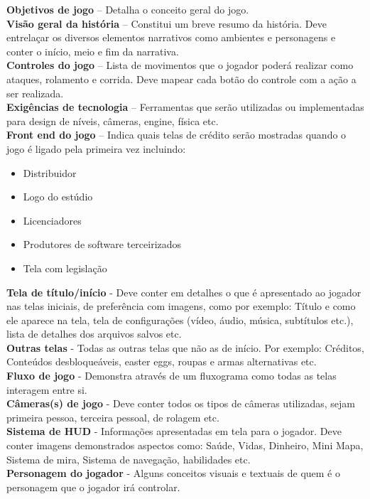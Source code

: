 \documentclass[12pt, 
openright, 
oneside, 
a4paper,    
brazil]{facom-ufu-abntex2}
\begin{document}
\textbf{Objetivos de jogo} – Detalha o conceito geral do jogo.\\
\textbf{Visão geral da história} – Constitui um breve resumo da história. Deve entrelaçar os diversos elementos narrativos como ambientes e personagens e conter o início, meio e fim da narrativa. \\
\textbf{Controles do jogo} – Lista de movimentos que o jogador poderá realizar como ataques, rolamento e corrida. Deve mapear cada botão do controle com a ação a ser realizada. \\
\textbf{Exigências de tecnologia} – Ferramentas que serão utilizadas ou implementadas para design de níveis, câmeras, engine, física etc. \\
\textbf{Front end do jogo} – Indica quais telas de crédito serão mostradas quando o jogo é ligado pela primeira vez incluindo: 
	\begin{itemize}
	\item Distribuidor
	\item Logo do estúdio
	\item Licenciadores
	\item Produtores de software terceirizados
	\item Tela com legislação
	\end{itemize}
\textbf{Tela de título/início} - Deve conter em detalhes o que é apresentado ao jogador nas telas iniciais, de preferência com imagens, como por exemplo: Título e como ele aparece na tela, tela de configurações (vídeo, áudio, música, subtítulos etc.), lista de detalhes dos arquivos salvos etc.\\
\textbf{Outras telas} - Todas as outras telas que não as de início. Por exemplo: Créditos, Conteúdos desbloqueáveis, easter eggs, roupas e armas alternativas etc.\\
\textbf{Fluxo de jogo} - Demonstra através de um fluxograma como todas as telas interagem entre si.\\
\textbf{Câmeras(s) de jogo} - Deve conter todos os tipos de câmeras utilizadas, sejam primeira pessoa, terceira pessoal, de rolagem etc.\\
\textbf{Sistema de HUD} - Informações apresentadas em tela para o jogador. Deve conter imagens demonstrados aspectos como: Saúde, Vidas, Dinheiro, Mini Mapa, Sistema de mira, Sistema de navegação, habilidades etc.\\
\textbf{Personagem do jogador} - Alguns conceitos visuais e textuais de quem é o personagem que o jogador irá controlar.\\
\end{document}
